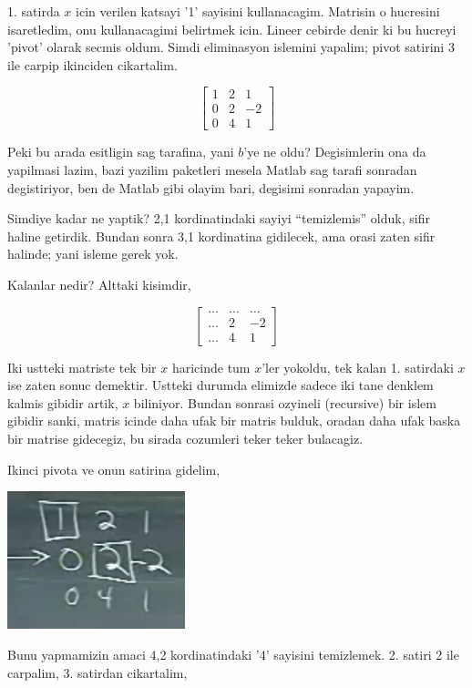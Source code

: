 \documentclass[12pt,fleqn]{article}\usepackage{../common}
\begin{document}
1. satirda $x$ icin verilen katsayi '1' sayisini kullanacagim. Matrisin o
hucresini isaretledim, onu kullanacagimi belirtmek icin. Lineer cebirde
denir ki bu hucreyi 'pivot' olarak secmis oldum. Simdi eliminasyon islemini
yapalim; pivot satirini 3 ile carpip ikinciden cikartalim.

$$ 
\left[\begin{array}{rrr}
    1 & 2 & 1 \\
    0 & 2 & -2 \\
    0 & 4 & 1
  \end{array}\right]
$$

Peki bu arada esitligin sag tarafina, yani $b$'ye ne oldu? Degisimlerin ona
da yapilmasi lazim, bazi yazilim paketleri mesela Matlab sag tarafi
sonradan degistiriyor, ben de Matlab gibi olayim bari, degisimi sonradan
yapayim. 

Simdiye kadar ne yaptik? 2,1 kordinatindaki sayiyi ``temizlemis'' olduk,
sifir haline getirdik. Bundan sonra 3,1 kordinatina gidilecek, ama orasi
zaten sifir halinde; yani isleme gerek yok. 

Kalanlar nedir? Alttaki kisimdir,

$$ 
\left[\begin{array}{rrr}
    \dots & \dots & \dots \\
    \dots &  2 & -2 \\
    \dots & 4 &  1
  \end{array}\right]
$$

Iki ustteki matriste tek bir $x$ haricinde tum $x$'ler yokoldu, tek kalan
1. satirdaki $x$ ise zaten sonuc demektir. Ustteki durumda elimizde sadece
iki tane denklem kalmis gibidir artik, $x$ biliniyor. Bundan sonrasi
ozyineli (recursive) bir islem gibidir sanki, matris icinde daha ufak bir
matris bulduk, oradan daha ufak baska bir matrise gidecegiz, bu sirada
cozumleri teker teker bulacagiz.

Ikinci pivota ve onun satirina gidelim,

\includegraphics[height=4cm]{2_02.png}

Bunu yapmamizin amaci 4,2 kordinatindaki '4' sayisini temizlemek. 2. satiri
2 ile carpalim, 3. satirdan cikartalim,
\end{document}
